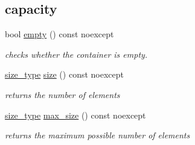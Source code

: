 \subsection*{capacity}
\begin{DoxyCompactItemize}
\item 
bool \hyperlink{classnlohmann_1_1basic__json_a1a86d444bfeaa9518d2421aedd74444a}{empty} () const noexcept
\begin{DoxyCompactList}\small\item\em checks whether the container is empty. \end{DoxyCompactList}\item 
\hyperlink{classnlohmann_1_1basic__json_a39f2cd0b58106097e0e67bf185cc519b}{size\+\_\+type} \hyperlink{classnlohmann_1_1basic__json_a25e27ad0c6d53c01871c5485e1f75b96}{size} () const noexcept
\begin{DoxyCompactList}\small\item\em returns the number of elements \end{DoxyCompactList}\item 
\hyperlink{classnlohmann_1_1basic__json_a39f2cd0b58106097e0e67bf185cc519b}{size\+\_\+type} \hyperlink{classnlohmann_1_1basic__json_a2f47d3c6a441c57dd2be00449fbb88e1}{max\+\_\+size} () const noexcept
\begin{DoxyCompactList}\small\item\em returns the maximum possible number of elements \end{DoxyCompactList}\end{DoxyCompactItemize}

